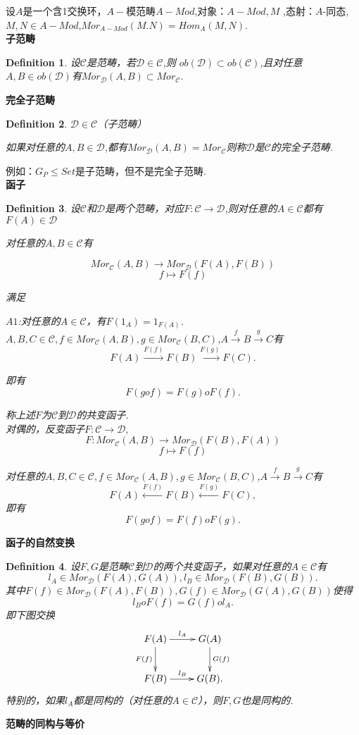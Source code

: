 \documentclass[UTF8]{article}
\newtheorem{defn}{Definition}[section]
\begin{document}
设$A$是一个含1交换环，$A-$模范畴$A-Mod$,对象：$A-Mod,M$
,态射：$A$-同态,$M,N\in A-Mod$,$Mor_{A-Mod}(M.N)=Hom_{A}(M,N).$\\
\textbf{子范畴}
\begin{defn}
	


设$\mathscr{C}$是范畴，若$\mathscr{D}\in \mathscr{C}$,则
$ob(\mathscr{D})\subset ob(\mathscr{C})$,且对任意$A,B\in ob(\mathscr{D})$有$Mor_{\mathscr{D}}(A,B)\subset Mor_{\mathscr{C}}.$ 
\
\end{defn}
\textbf{完全子范畴}
\begin{defn}
$\mathscr{D}\in \mathscr{C}$（子范畴）

如果对任意的$A,B\in \mathscr{D}$,都有$Mor_{\mathscr{D}}(A,B)=Mor_{\mathscr{C}}$则称$\mathscr{D}$是$\mathscr{C}$的完全子范畴.
\end{defn}
例如：$G_{P}\leqslant Set$是子范畴，但不是完全子范畴.\\
\textbf{函子}
\begin{defn}
设$\mathscr{C}$和$\mathscr{D}$是两个范畴，对应$F:\mathscr{C}\longrightarrow \mathscr{D}$,则对任意的$A\in \mathscr{C}$都有$F(A)\in \mathscr{D}$

对任意的$A,B\in \mathscr{C}$有

$$Mor_{\mathscr{C}}(A,B)\longrightarrow Mor_{\mathscr{D}}(F(A),F(B))$$
$$f\longmapsto F(f)$$

满足

$A1$:对任意的$A\in \mathscr{C}$，有$F(1_{A})=1_{F(A)}$.\\
$A,B,C\in \mathscr{C},f\in Mor_{\mathscr{C}}(A,B),g\in Mor_{\mathscr{C}}(B,C)$,$A\xrightarrow{f}B\xrightarrow{g}C$有
$$F(A)\xrightarrow{F(f)}F(B)\xrightarrow{F(g)}F(C).$$

即有
$$F(gof)=F(g)oF(f).$$

称上述$F$为$\mathscr{C}$到$\mathscr{D}$的共变函子.\\
对偶的，反变函子$F:\mathscr{C}\longrightarrow \mathscr{D},$
$$F:Mor_{\mathscr{C}}(A,B)\longrightarrow Mor_{\mathscr{D}}(F(B),F(A))$$
$$f\longmapsto F(f)$$

对任意的$A,B,C\in \mathscr{C},f\in Mor_{\mathscr{C}}(A,B),g\in Mor_{\mathscr{C}}(B,C)$,$A\xrightarrow{f}B\xrightarrow{g}C$有
$$F(A)\xleftarrow{F(f)}F(B)\xleftarrow{F(g)}F(C),$$
即有
$$F(gof)=F(f)oF(g).$$
\end{defn}
\textbf{函子的自然变换}
\begin{defn}
设$F,G$是范畴$\mathscr{C}$到$\mathscr{D}$的两个共变函子，如果对任意的$A\in \mathscr{C}$有
$$l_{A}\in Mor_{\mathscr{D}}(F(A),G(A)),l_{B}\in Mor_{\mathscr{D}}(F(B),G(B)).$$
其中$F(f)\in Mor_{\mathscr{D}}(F(A),F(B)),G(f)\in Mor_{\mathscr{D}}(G(A),G(B))$使得
$$l_{B}oF(f)=G(f)ol_{A}.$$
即下图交换
$$
\xymatrix{
	F(A)\ar[r]^{l_{A}}\ar[d]_{F(f)}&G(A)\ar[d]^{G(f)}\\
	F(B)\ar[r]^{l_{B}}&G(B).
}
$$
特别的，如果$l_{A}$都是同构的（对任意的$A\in \mathscr{C}$），则$F,G$也是同构的.
\end{defn}
\textbf{范畴的同构与等价}
\end{document}
